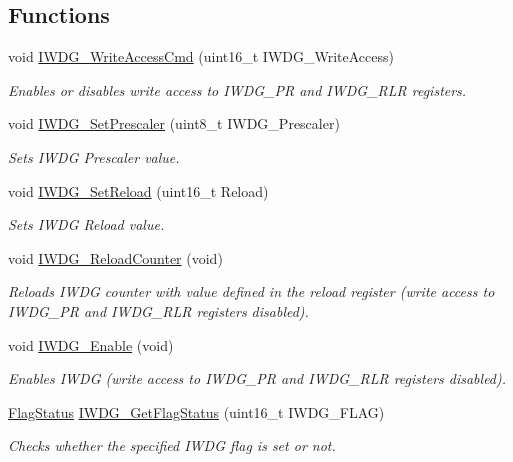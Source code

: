 \subsection*{Functions}
\begin{DoxyCompactItemize}
\item 
void \hyperlink{group___i_w_d_g___exported___functions_gae466681e5bdc11b353c508b89d75ca05}{I\+W\+D\+G\+\_\+\+Write\+Access\+Cmd} (uint16\+\_\+t I\+W\+D\+G\+\_\+\+Write\+Access)
\begin{DoxyCompactList}\small\item\em Enables or disables write access to I\+W\+D\+G\+\_\+\+PR and I\+W\+D\+G\+\_\+\+R\+LR registers. \end{DoxyCompactList}\item 
void \hyperlink{group___i_w_d_g___exported___functions_ga4fa7f1cd690533a35ad9e4729c0450a3}{I\+W\+D\+G\+\_\+\+Set\+Prescaler} (uint8\+\_\+t I\+W\+D\+G\+\_\+\+Prescaler)
\begin{DoxyCompactList}\small\item\em Sets I\+W\+DG Prescaler value. \end{DoxyCompactList}\item 
void \hyperlink{group___i_w_d_g___exported___functions_gae2a14752a0431f23cb80cebf202ac365}{I\+W\+D\+G\+\_\+\+Set\+Reload} (uint16\+\_\+t Reload)
\begin{DoxyCompactList}\small\item\em Sets I\+W\+DG Reload value. \end{DoxyCompactList}\item 
void \hyperlink{group___i_w_d_g___exported___functions_ga7147ebabdc3fef97f532b171a4e70d49}{I\+W\+D\+G\+\_\+\+Reload\+Counter} (void)
\begin{DoxyCompactList}\small\item\em Reloads I\+W\+DG counter with value defined in the reload register (write access to I\+W\+D\+G\+\_\+\+PR and I\+W\+D\+G\+\_\+\+R\+LR registers disabled). \end{DoxyCompactList}\item 
void \hyperlink{group___i_w_d_g___exported___functions_ga479b2921c86f8c67b819f5c4bea6bdb6}{I\+W\+D\+G\+\_\+\+Enable} (void)
\begin{DoxyCompactList}\small\item\em Enables I\+W\+DG (write access to I\+W\+D\+G\+\_\+\+PR and I\+W\+D\+G\+\_\+\+R\+LR registers disabled). \end{DoxyCompactList}\item 
\hyperlink{group___exported__types_ga89136caac2e14c55151f527ac02daaff}{Flag\+Status} \hyperlink{group___i_w_d_g___exported___functions_ga37f050cfbedc0c15f9e0816c0b22011e}{I\+W\+D\+G\+\_\+\+Get\+Flag\+Status} (uint16\+\_\+t I\+W\+D\+G\+\_\+\+F\+L\+AG)
\begin{DoxyCompactList}\small\item\em Checks whether the specified I\+W\+DG flag is set or not. \end{DoxyCompactList}\end{DoxyCompactItemize}


